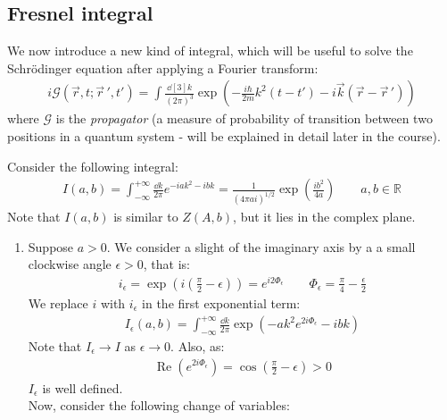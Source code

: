 \documentclass[../template.tex]{subfiles}
\begin{document}
\subsection{Fresnel integral}
We now introduce a new kind of integral, which will be useful to solve the Schr\"odinger equation after applying a Fourier transform:
\begin{align*}
    i \mathcal{G}(\vec{r},t; \vec{r}\,',t') = \int \frac{\dd[3]{k}}{(2\pi)^3} \exp\left(-\frac{i \hbar}{2m}k^2(t-t') - i \vec{k}(\vec{r}-\vec{r}\,') \right) 
\end{align*}
where $\mathcal{G}$ is the \textit{propagator} (a measure of probability of transition between two positions in a quantum system - will be explained in detail later in the course).\\

\begin{example}
    Consider the following integral:
    \begin{align*}
        I(a,b) = \int_{-\infty}^{+\infty} \frac{\dd{k}}{2 \pi} e^{-iak^2 - ibk} = \frac{1}{(4 \pi a i)^{1/2}} \exp\left(\frac{ib^2}{4a} \right)  \qquad a,b \in \mathbb{R}
    \end{align*}
    Note that $I(a,b)$ is similar to $Z(A,b)$, but it lies in the complex plane.
    \begin{enumerate}
        \item Suppose $a > 0$. We consider a slight  of the imaginary axis by a a small clockwise angle $\epsilon > 0$, that is:
        \begin{align*}
            i_\epsilon = \exp\left(i \left(\frac{\pi}{2} - \epsilon\right)\right) = e^{i 2 \Phi_\epsilon} \qquad \Phi_\epsilon = \frac{\pi}{4} - \frac{\epsilon}{2}    
        \end{align*}     
        We replace $i$ with $i_\epsilon$ in the first exponential term:  
        \begin{align*}
            I_\epsilon(a,b) = \int_{-\infty}^{+\infty} \frac{\dd{k}}{2 \pi} \exp(-a k^2 e^{2i \Phi_\epsilon} - ibk)
        \end{align*}
        Note that $I_\epsilon \to I$ as $\epsilon \to 0$. Also, as:
        \begin{align*}
            \operatorname{Re}(e^{2i \Phi_\epsilon}) = \cos\left(\frac{\pi}{2} - \epsilon \right)  > 0
        \end{align*}  
        $I_\epsilon$ is well defined.\\
        Now, consider the following change of variables:
        \begin{align*}

\end{align*}
\end{enumerate}
\end{example}
\end{document}
